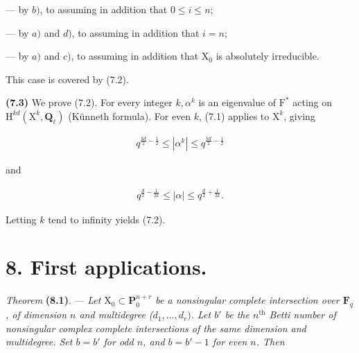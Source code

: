 \documentclass[10pt,leqno]{article}
\begin{document}
\noindent — by \(b)\), to assuming in addition that \(0\leq i\leq n\);\par

\noindent — by \(a)\) and \(d)\), to assuming in addition that \(i=n\);\par

\noindent — by \(a)\) and \(c)\), to assuming in addition that \(\mathrm{X}_{0}\) is absolutely irreducible.\par

\noindent This case is covered by (7.2).\par

\noindent \textbf{(7.3)} We prove (7.2). For every integer \(k, \alpha ^{k}\) is an eigenvalue of \(\mathrm{F}^{*}\) acting on \(\mathrm{H}^{kd}(\mathrm{X}^{k},\mathbf{Q}_{\ell })\) (Künneth formula). For even \(k\), (7.1) applies to \(\mathrm{X}^{k}\), giving\par

\begin{equation*}\begin{gathered}q^{\frac{kd}{2}- \frac{1}{2}} \leq  |\alpha ^{k}| \leq  q^{\frac{kd}{2}- \frac{1}{2}}\end{gathered}\end{equation*}

\noindent and\par

\begin{equation*}\begin{gathered}q^{\frac{d}{2}- \frac{1}{2k}} \leq  |\alpha | \leq  q^{\frac{d}{2}+\frac{1}{2k}}.\end{gathered}\end{equation*}

\noindent Letting \(k\) tend to infinity yields (7.2).\par

\section*{8. First applications.}

\noindent \emph{Theorem} \textbf{(8.1)}. — {\itshape Let \(\mathrm{X}_{0}\subset \mathbf{P}_{0}^{n+r}\) be a nonsingular complete intersection over \(\mathbf{F}_{q}\), of dimension \(n\) and multidegree (\(d_{1},\ldots ,d_{r})\). Let \(b'\) be the \(n^{\mathrm{th}}\) Betti number of nonsingular complex complete intersections of the same dimension and multidegree. Set \(b=b'\) for odd \(n\), and \(b=b'- 1\) for even \(n\). Then}\par
\end{document}
